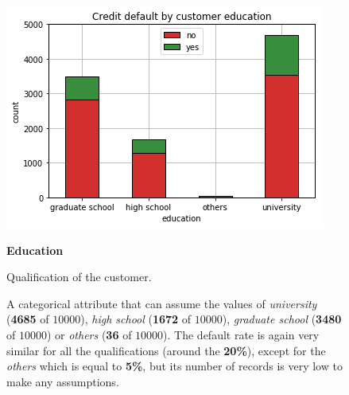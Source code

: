 \begin{figure}[h]
  \begin{minipage}[h]{.50\textwidth}
    \includegraphics[width=.95\textwidth]{img/ch2/education}
  \end{minipage}
  \begin{minipage}[h]{.50\textwidth}
        {\Large \textbf{Education}}
        
        Qualification of the customer.
        
        A categorical attribute that can assume the values of 
        \textit{university} (\textbf{4685} of $10000$),
        \textit{high school} (\textbf{1672} of $10000$),
        \textit{graduate school} (\textbf{3480} of $10000$) or
        \textit{others} (\textbf{36} of $10000$).
        The default rate is again very similar for all the qualifications (around the \textbf{20\%}), except for the \textit{others} which is equal to \textbf{5\%}, but its number of records is very low to make any assumptions.
  \end{minipage}
\end{figure}

